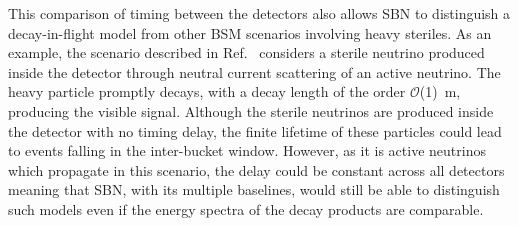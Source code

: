 \documentclass[11pt, a4paper]{article}
\newcommand{\refref}[1]{Ref.~\cite{#1}}
\begin{document}
This comparison of timing between the detectors also allows SBN to distinguish
a decay-in-flight model from other BSM scenarios involving heavy steriles. As an
example, the scenario described in \refref{Gninenko:2009ks,Gninenko:2010pr}
considers a sterile neutrino produced inside the detector through neutral
current scattering of an active neutrino. The heavy particle promptly
decays, with a decay length of the order $\mathcal{O}$(1)~m, producing the
visible signal. Although the sterile neutrinos are produced inside the detector with no
timing delay, the finite lifetime of these particles could lead to events
falling in the inter-bucket window. However, as it is active neutrinos which propagate in this scenario, the delay could be constant
across all detectors meaning that SBN, with its multiple baselines, would still
be able to distinguish such models even if the energy spectra of the decay
products are comparable.
\end{document}
